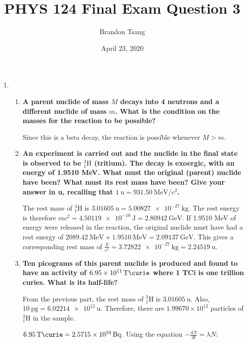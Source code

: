\documentclass[11pt]{article}
\title{PHYS 124 Final Exam Question 3}
\author{Brandon Tsang}
\date{April 23, 2020}
\begin{document}
    \maketitle
    \begin{enumerate}[label=\textbf{\arabic*.}, start=3]
        \item{
            \begin{enumerate}[label=\textbf{(\alph*)}]
                \item{
                    \textbf{\boldmath A parent nuclide of mass \(M\) decays into 4 neutrons and a different nuclide of mass \(m\). What is the condition on the masses for the reaction to be possible?}
                    \par
                    Since this is a beta decay, the reaction is possible whenever \(M>m\).
                }
                \item{
                    \textbf{\boldmath An experiment is carried out and the nuclide in the final state is observed to be \(^3_1\mathrm{H}\) (tritium). The decay is exoergic, with an energy of 1.9510 MeV. What must the original (parent) nuclide have been? What must its rest mass have been? Give your answer in u, recalling that \(\SI{1}{\atomicmassunit}=\SI{931.50}{\MeV}/c^2\).}
                    \par
                    The rest mass of \(^3_1\mathrm{H}\) is \(\SI{3.01605}{\atomicmassunit}=\SI{5.00827e-27}{\kilogram}\). The rest energy is therefore \(mc^2=\SI{4.50119e-10}{\joule}=\SI{2.80942}{\GeV}\). If 1.9510 MeV of energy were released in the reaction, the original nuclide must have had a rest energy of \(\SI{2089.42}{\MeV}+\SI{1.9510}{\MeV}=\SI{2.09137}{\GeV}\). This gives a corresponding rest mass of \(\frac{E}{c^2}=\SI{3.72822e-27}{\kilogram}=\SI{2.24519}{\atomicmassunit}\).
                }
                \item{
                    \textbf{\boldmath Ten picograms of this parent nuclide is produced and found to have an activity of \(\SI{6.95e11}{\tera\curie}\) where 1 TCi is one trillion curies. What is its half-life?}
                    \par
                    From the previous part, the rest mass of \(^3_1\mathrm{H}\) is \(\SI{3.01605}{\atomicmassunit}\). Also, \(\SI{10}{\pico\gram}=\SI{6.02214e12}{\atomicmassunit}\). Therefore, there are \(1.99670\times10^{12}\) particles of \(^3_1\mathrm{H}\) in the sample.
                    \par
                    \(\SI{6.95}{\tera\curie}=\SI{2.5715e34}{\becquerel}\). Using the equation \(-\frac{dN}{dt}=\lambda N\):
}
\end{enumerate}}
\end{enumerate}
\end{document}
